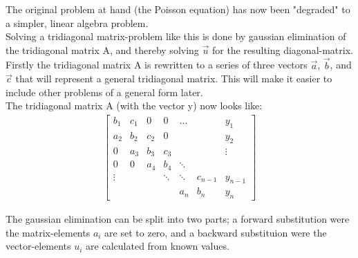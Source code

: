 \documentclass[11pt,a4paper,notitlepage]{article}
\begin{document}
The original problem at hand (the Poisson equation) has now been "degraded" to a simpler, linear algebra problem. \\
Solving a tridiagonal matrix-problem like this is done by gaussian elimination of the tridiagonal matrix A, and thereby solving $\vec{u}$ for the resulting diagonal-matrix. \\

Firstly the tridiagonal matrix A is rewritten to a series of three vectors $\vec{a}$, $\vec{b}$, and $\vec{c}$ that will represent a general tridiagonal matrix. This will make it easier to include other problems of a general form later. \\
The tridiagonal matrix A (with the vector y) now looks like: 
\begin{align*}
	\begin{bmatrix} %
		b_1 & c_1 & 0 & 0 & \hdots && y_1\\
		a_2 & b_2 & c_2 & 0 &&& y_2\\
		0 & a_3 & b_3 & c_3 &&& \vdots\\
		0 & 0 & a_4 & b_4 & \ddots &  & \\
		\vdots &&& \ddots & \ddots & c_{n-1} & y_{n-1} \\
		&&&& a_n & b_n &y_n
	\end{bmatrix} %
\end{align*}

The gaussian elimination can be split into two parts; a forward substitution were the matrix-elements $a_i$ are set to zero, and a backward substituion were the vector-elements $u_i$ are calculated from known values. \\
\end{document}

